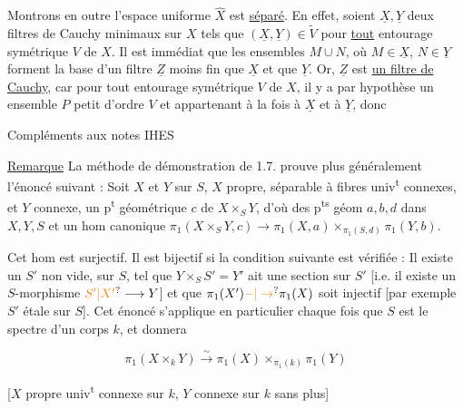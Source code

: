 Montrons en outre l'espace uniforme $\hat X$ est \uline{séparé}. En effet, soient $\underline X,\underline Y$ deux filtres de Cauchy minimaux sur $X$ tels que $(\underline X,\underline Y)\in\tilde V$ pour \uline{tout} entourage symétrique $V$ de $X$. Il est immédiat que les ensembles $M\cup N$, où $M\in\underline X$, $N\in\underline Y$ forment la base d'un filtre $\underline Z$ moins fin que $\underline X$ et que $\underline Y$. Or, $\underline Z$ est \uline{un filtre de Cauchy}, car pour tout entourage symétrique $V$ de $X$, il y a par hypothèse un ensemble $P$ petit d'ordre $V$ et appartenant à la fois à $\underline X$ et à $\underline Y$, donc


Compléments aux notes IHES


\uline{Remarque} La méthode de démonstration de 1.7. prouve plus généralement l'énoncé suivant : Soit $X$ et $Y$ sur $S$, $X$ propre,  séparable à fibres univ\textsuperscript{t} connexes, et $Y$ connexe,   un p\textsuperscript{t} géométrique $c$ de $X\times_S Y$, d'où des p\textsuperscript{ts} géom $a,b,d$ dans $X,Y,S$ et un hom canonique $\pi_1(X\times_S Y,c)\longrightarrow\pi_1(X,a)\times_{\pi_1(S,d)}\pi_1(Y,b)$.

Cet hom est surjectif.  Il est bijectif si  la condition suivante est vérifiée : Il existe un $S'$   non vide,  sur $S$, tel que $Y\times_S S'=Y'$ ait une section sur $S'$ [i.e.  il existe un $S$-morphisme $\unsure{S'|X'}\longrightarrow Y$]  et que $\pi_1(X')\unsure{-|\to}\pi_1(X)$ soit injectif [par exemple  $S'$ étale sur $S$]. Cet énoncé s'applique en particulier chaque fois que $S$ est le spectre d'un corps $k$, et donnera


\[
\pi_1(X\times_k Y)\xrightarrow{\sim}\pi_1(X)\times_{\pi_1(k)}\pi_1(Y)
\]

[$X$ propre univ\textsuperscript{t} connexe sur $k$, $Y$  connexe sur $k$ sans plus]

